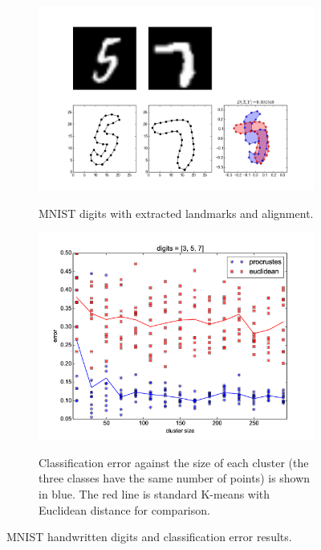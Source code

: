 \documentclass[simplex.tex]{subfiles}
\begin{document}
\begin{figure}[h!]
\begin{cframed}
\centering
\begin{subfigure}[t]{0.45\textwidth}
\includegraphics[width=\textwidth]{../../figs/nonpar57.png}
\label{fig:nonpar57}
\caption{
  MNIST digits with extracted landmarks and alignment.
  }
\end{subfigure}
\begin{subfigure}[t]{0.45\textwidth}
\includegraphics[width=\textwidth]{../../figs/nonPar357.png}
\label{fig:nonpar357}
\caption{
Classification error against the size of each
cluster (the three classes have the same number of points) is
shown in blue. The red line is standard
K-means with Euclidean distance for comparison.}
\end{subfigure}
\caption{
  MNIST handwritten digits and classification error results.
}
\label{fig:nonpar}
\end{cframed}
\end{figure}
\end{document}
